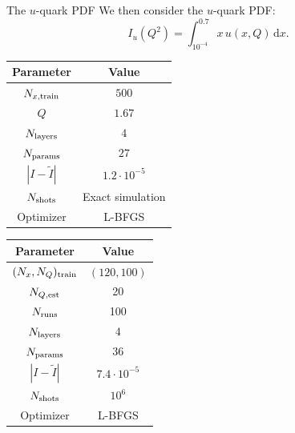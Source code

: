 \documentclass[8pt, xcolor={svgnames}, hyperref={linkcolor=black}]{beamer}
\begin{document}
\begin{frame}{The $u$-quark PDF}
We then consider the $u$-quark PDF:
\begin{equation}
I_u(Q^2) = \int_{10^{-4}}^{0.7} x\,u(x,Q)\,\text{d}x.
\end{equation}
\pause
\vspace{-0.3cm}

\begin{multicols}{2}
\footnotesize
\begin{table}
\begin{tabular}{cc}
\hline \hline
\textbf{Parameter} & \textbf{Value} \\
\hline
$N_{x, \rm train}$ & $500$ \\
$Q$ & $1.67$ \\
$N_{\rm layers}$ & $4$ \\
$N_{\rm params}$ & $27$ \\ 
$|I - \tilde{I}|$ & $1.2 \cdot 10^{-5}$ \\
$N_{\rm shots}$ & Exact simulation \\
Optimizer & L-BFGS \\
\hline \hline 
\end{tabular}
\end{table}

\begin{table}
\begin{tabular}{cc}
\hline \hline
\textbf{Parameter} & \textbf{Value} \\
\hline
$(N_x, N_Q)_{\rm train}$ & $(120, 100)$ \\
$N_{Q, \rm est}$ & 20 \\
$N_{\rm runs}$ & 100 \\
$N_{\rm layers}$ & $4$ \\
$N_{\rm params}$ & $36$ \\ 
$|I - \tilde{I}|$ & $7.4 \cdot 10^{-5}$ \\
$N_{\rm shots}$ & $10^{6}$ \\
Optimizer & L-BFGS \\
\hline \hline 
\end{tabular}
\end{table}
\end{multicols}


\end{frame}
\end{document}
